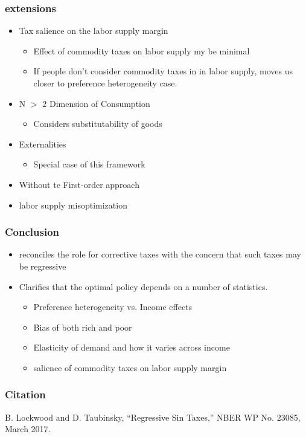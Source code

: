 \documentclass{beamer}
\begin{document}
\begin{frame}
\frametitle{extensions} 
\begin{itemize}
	\item Tax salience on the labor supply margin 
	\begin{itemize}
		\item Effect of commodity taxes on labor supply my be minimal 
		\item If people don't consider commodity taxes in in labor supply, moves us closer to preference heterogeneity case.
	\end{itemize}
	\item N $>$ 2 Dimension of Consumption 
	\begin{itemize}
		\item Considers substitutability of goods
	\end{itemize}
	\item Externalities 
	\begin{itemize}
		\item Special case of this framework 
	\end{itemize}
	\item Without te First-order approach
	\item labor supply misoptimization 
\end{itemize}

\end{frame}

\begin{frame}
\frametitle{Conclusion} 

\begin{itemize}
	\item reconciles the role for corrective taxes with the concern that such taxes may be regressive
	\item Clarifies that the optimal policy depends on a number of statistics. 
	\begin{itemize}
		\item Preference heterogeneity vs. Income effects 
		\item Bias of both rich and poor 
		\item Elasticity of demand and how it varies across income
		\item salience of commodity taxes on labor supply margin 
	\end{itemize}

\end{itemize}

\end{frame}
	
	
	\begin{frame}
	\frametitle{Citation} 
	
	B. Lockwood and D. Taubinsky, “Regressive Sin Taxes,” NBER WP No. 23085, March 2017.
	
	\end{frame}
	
	
\end{document}

